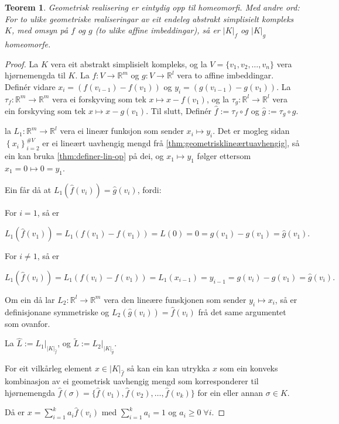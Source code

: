 \documentclass[a4paper, 12pt, norsk]{article}
\theoremstyle{plain}
\newtheorem{theorem}{Teorem}[section]
\theoremstyle{definition}
\newcommand{\Rb}{\mathbb{R}}
\newcommand{\gr}[1]{ \lvert #1 \rvert } %
\newcommand{\set}[1]{ \left\{ #1 \right\} } %
\begin{document}
\begin{theorem} \label{thm:gr-eintydig}
	Geometrisk realisering er eintydig opp til homeomorfi. Med andre ord: For to ulike geometriske realiseringar av eit endeleg abstrakt simplisielt kompleks $K$, med omsyn på $f$ og $g$ (to ulike affine imbeddingar), så er $\gr{K}_f$ og $\gr{K}_g$ homeomorfe.
\end{theorem}

\begin{proof}
	La $K$ vera eit abstrakt simplisielt kompleks, og la $V=\{ v_1, v_2, \dots, v_n \}$ vera hjørnemengda til $K$. La $f:V\to\Rb^m$ og $g:V\to\Rb^l$ vera to affine imbeddingar. Definér vidare $x_i=(f(v_{i-1})-f(v_1))$ og $y_i=(g(v_{i-1})-g(v_1))$. La $\tau_f:\Rb^m\to\Rb^m$ vera ei forskyving som tek $x\mapsto x-f(v_1)$, og la $\tau_g:\Rb^l\to\Rb^l$ vera ein forskyving som tek $x\mapsto x-g(v_1)$. Til slutt, Definér $\hat{f}:=\tau_f\circ f$ og $\hat{g}:=\tau_g \circ g$.
	
	la $L_1:\Rb^m\to\Rb^l$ vera ei lineær funksjon som sender $x_i\mapsto y_i$. Det er mogleg sidan \( \set{x_i}_{i=2}^{\#V} \) er ei lineært uavhengig mengd frå \autoref{thm:geometrisklineærtuavhengig}, så ein kan bruka \autoref{thm:definer-lin-op} på dei, og \( x_1 \mapsto y_1 \) følger ettersom \( x_1 = 0 \mapsto 0 = y_1 \).

	Ein får då at $L_1(\hat{f}(v_i))=\hat{g}(v_i)$, fordi:
	
	For $i=1$, så er

	\[
		L_1(\hat{f}(v_1))=L_1(f(v_1)-f(v_1))=L(0)=0=g(v_1)-g(v_1)=\hat{g}(v_1).
	\]

	For $i\neq 1$, så er

	\[
		L_1(\hat{f}(v_i))=L_1(f(v_i)-f(v_1))=L_1(x_{i-1})=y_{i-1}=g(v_i)-g(v_1)=\hat{g}(v_i).
	\]

	Om ein då lar $L_2:\Rb^l\to\Rb^m$ vera den lineære funskjonen som sender $y_i\mapsto x_i$, så er definisjonane symmetriske og \( L_2(\hat{g}(v_i))=\hat{f}(v_i) \) frå det same argumentet som ovanfor.

	La $\hat{L} := L_1|_{\gr{K}_{\hat{f}}}$, og $\tilde{L} := L_2|_{\gr{K}_{\hat{g}}}$.

	For eit vilkårleg element $x\in\gr{K}_{\hat{f}}$ så kan ein kan utrykka $x$ som ein konveks kombinasjon av ei geometrisk uavhengig mengd som korresponderer til hjørnemengda \( \hat{f}(\sigma) = \{\hat{f}(v_1), \hat{f}(v_2), \dots, \hat{f}(v_k)\} \) for ein eller annan \( \sigma \in K \).
	
	Då er $x=\sum_{i=1}^ka_i\hat{f}(v_i)$ med $\sum_{i=1}^ka_i=1$ og $a_i\geq0\; \forall i$. 
	

\end{proof}
\end{document}
